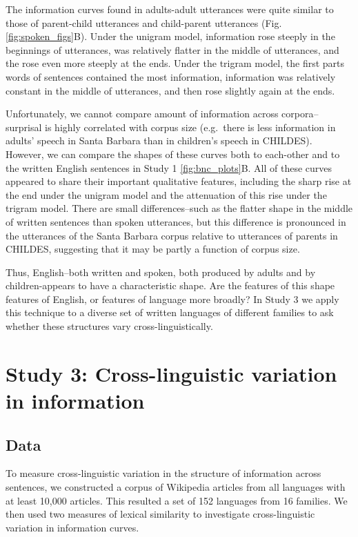 \documentclass[10pt, letterpaper]{article}
\begin{document}
The information curves found in adults-adult utterances were quite
similar to those of parent-child utterances and child-parent utterances
(Fig. \ref{fig:spoken_figs}B). Under the unigram model, information rose
steeply in the beginnings of utterances, was relatively flatter in the
middle of utterances, and the rose even more steeply at the ends. Under
the trigram model, the first parts words of sentences contained the most
information, information was relatively constant in the middle of
utterances, and then rose slightly again at the ends.

Unfortunately, we cannot compare amount of information across
corpora--surprisal is highly correlated with corpus size (e.g.~there is
less information in adults' speech in Santa Barbara than in children's
speech in CHILDES). However, we can compare the shapes of these curves
both to each-other and to the written English sentences in Study 1
\ref{fig:bnc_plots}B. All of these curves appeared to share their
important qualitative features, including the sharp rise at the end
under the unigram model and the attenuation of this rise under the
trigram model. There are small differences--such as the flatter shape in
the middle of written sentences than spoken utterances, but this
difference is pronounced in the utterances of the Santa Barbara corpus
relative to utterances of parents in CHILDES, suggesting that it may be
partly a function of corpus size.

Thus, English--both written and spoken, both produced by adults and by
children-appears to have a characteristic shape. Are the features of
this shape features of English, or features of language more broadly? In
Study 3 we apply this technique to a diverse set of written languages of
different families to ask whether these structures vary
cross-linguistically.

\hypertarget{study-3-cross-linguistic-variation-in-information}{%
\section{Study 3: Cross-linguistic variation in
information}\label{study-3-cross-linguistic-variation-in-information}}

\hypertarget{data-2}{%
\subsection{Data}\label{data-2}}

To measure cross-linguistic variation in the structure of information
across sentences, we constructed a corpus of Wikipedia articles from all
languages with at least 10,000 articles. This resulted a set of 152
languages from 16 families. We then used two measures of lexical
similarity to investigate cross-linguistic variation in information
curves.
\end{document}
